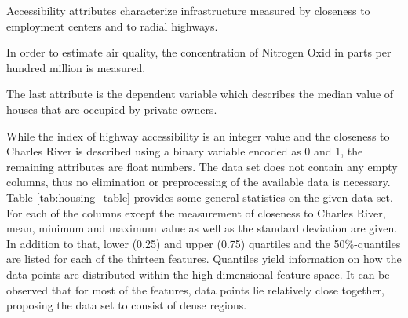 Accessibility attributes characterize infrastructure measured by closeness to employment centers and to radial highways. 

In order to estimate air quality, the concentration of Nitrogen Oxid in parts per hundred million is measured. 

The last attribute is the dependent variable which describes the median value of houses that are occupied by private owners. 

While the index of highway accessibility is an integer value and the closeness to Charles River is described using a binary variable encoded as 0 and 1, the remaining attributes are float numbers. The data set does not contain any empty columns, thus no elimination or preprocessing of the available data is necessary.\newline
Table \ref{tab:housing_table} provides some general statistics on the given data set. For each of the columns except the measurement of closeness to Charles River, mean, minimum and maximum value as well as the standard deviation are given. In addition to that, lower (0.25) and upper (0.75) quartiles and the 50\%-quantiles are listed for each of the thirteen features. Quantiles yield information on how the data points are distributed within the high-dimensional feature space. It can be observed that for most of the features, data points lie relatively close together, proposing the data set to consist of dense regions. 

